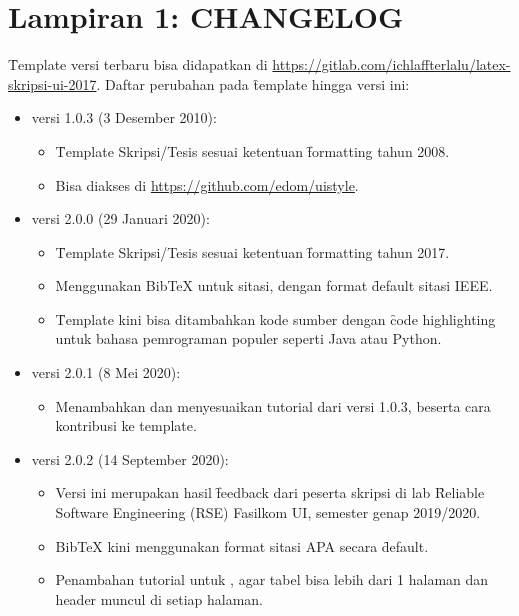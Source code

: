 \chapter*{Lampiran 1: CHANGELOG}
\label{appendix:changelog}

\f{Template} versi terbaru bisa didapatkan di \url{https://gitlab.com/ichlaffterlalu/latex-skripsi-ui-2017}.
Daftar perubahan pada \f{template} hingga versi ini:
\begin{itemize}
	\item versi 1.0.3 (3 Desember 2010):
		\begin{itemize}
			\item \f{Template} Skripsi/Tesis sesuai ketentuan \f{formatting} tahun 2008.
			\item Bisa diakses di \url{https://github.com/edom/uistyle}.
		\end{itemize}
	\item versi 2.0.0 (29 Januari 2020):
		\begin{itemize}
			\item \f{Template} Skripsi/Tesis sesuai ketentuan \f{formatting} tahun 2017.
			\item Menggunakan BibTeX untuk sitasi, dengan format \f{default} sitasi IEEE.
			\item \f{Template} kini bisa ditambahkan kode sumber dengan \f{code highlighting} untuk bahasa pemrograman populer seperti Java atau Python.
		\end{itemize}
	\item versi 2.0.1 (8 Mei 2020):
		\begin{itemize}
			\item Menambahkan dan menyesuaikan tutorial dari versi 1.0.3, beserta cara kontribusi ke template.
		\end{itemize}
	\item versi 2.0.2 (14 September 2020):
		\begin{itemize}
			\item Versi ini merupakan hasil \f{feedback} dari peserta skripsi di lab \f{Reliable Software Engineering} (RSE) Fasilkom UI, semester genap 2019/2020.
			\item BibTeX kini menggunakan format sitasi APA secara \f{default}.
			\item Penambahan tutorial untuk , agar tabel bisa lebih dari 1 halaman dan header muncul di setiap halaman.

\end{itemize}
\end{itemize}
